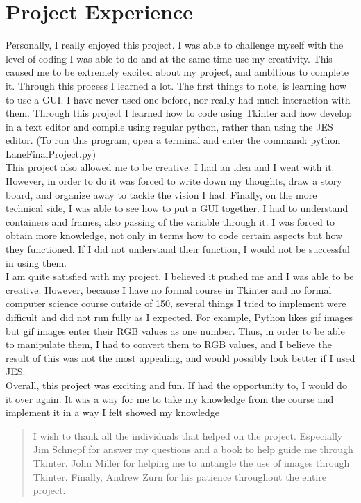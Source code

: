 \documentclass[11pt]{article}%
\begin{document}
\section*{Project Experience}
 
\indent Personally, I really enjoyed this project. I was able to challenge myself with the level of coding I was able to do and at the same time use my creativity. This caused me to be extremely excited about my project, and ambitious to complete it. Through this process I learned a lot.
The first things to note, is learning how to use a GUI. I have never used one before, nor really had much interaction with them. Through this project I learned how to code using Tkinter and how develop in a text editor and compile using regular python, rather than using the JES editor. (To run this program, open a terminal and enter the command: python LaneFinalProject.py) \\
\indent This project also allowed me to be creative. I had an idea and I went with it. However, in order to do it was forced to write down my thoughts, draw a story board, and organize away to tackle the vision I had. Finally, on the more technical side, I was able to see how to put a GUI together. I had to understand containers and frames, also passing of the variable through it. I was forced to obtain more knowledge, not only in terms how to code certain aspects but how they functioned. If I did not understand their function, I would not be successful in using them.\\
\indent I am quite satisfied with my project. I believed it pushed me and I was able to be creative. However, because I have no formal course in Tkinter and no formal computer science course outside of 150, several things I tried to implement were difficult and did not run fully as I expected. For example, Python likes gif images but gif images enter their RGB values as one number. Thus, in order to be able to manipulate them, I had to convert them to RGB values, and I believe the result of this was not the most appealing, and would possibly look better if I used JES.\\
\indent Overall, this project was exciting and fun. If had the opportunity to, I would do it over again. It was a way for me to take my knowledge from the course and implement it in a way I felt showed my knowledge %
 
\renewcommand{\abstractname}{Acknowledgements}
\begin{abstract}
I wish to thank all the individuals that helped on the project. Especially Jim Schnepf for answer my questions and a book to help guide me through Tkinter. John Miller for helping me to untangle the use of images through Tkinter. Finally, Andrew Zurn for his patience throughout the entire project.
\end{abstract}
 
\end{document}
